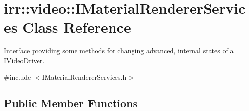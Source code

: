 \hypertarget{classirr_1_1video_1_1IMaterialRendererServices}{}\section{irr\+:\+:video\+:\+:I\+Material\+Renderer\+Services Class Reference}
\label{classirr_1_1video_1_1IMaterialRendererServices}


Interface providing some methods for changing advanced, internal states of a \hyperlink{classirr_1_1video_1_1IVideoDriver}{I\+Video\+Driver}.  




{\ttfamily \#include $<$I\+Material\+Renderer\+Services.\+h$>$}

\subsection*{Public Member Functions}
